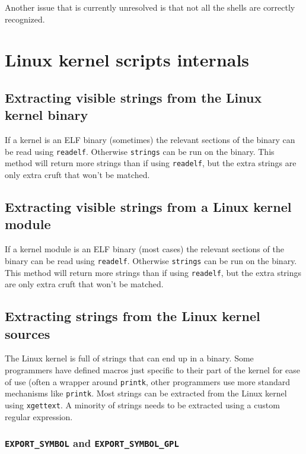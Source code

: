 \documentclass[10pt]{article}
\begin{document}
Another issue that is currently unresolved is that not all the shells are correctly recognized.

\section{Linux kernel scripts internals}

\subsection{Extracting visible strings from the Linux kernel binary}

If a kernel is an ELF binary (sometimes) the relevant sections of the
binary can be read using \texttt{readelf}. Otherwise \texttt{strings} can be
run on the binary. This method will return more strings than if using
\texttt{readelf}, but the extra strings are only extra cruft that won't be
matched.

\subsection{Extracting visible strings from a Linux kernel module}

If a kernel module is an ELF binary (most cases) the relevant sections of the
binary can be read using \texttt{readelf}. Otherwise \texttt{strings} can be
run on the binary. This method will return more strings than if using
\texttt{readelf}, but the extra strings are only extra cruft that won't be
matched.

\subsection{Extracting strings from the Linux kernel sources}

The Linux kernel is full of strings that can end up in a binary. Some
programmers have defined macros just specific to their part of the kernel for
ease of use (often a wrapper around \texttt{printk}, other programmers use
more standard mechanisms like \texttt{printk}. Most strings can be extracted
from the Linux kernel using \texttt{xgettext}. A minority of strings needs to
be extracted using a custom regular expression.

\subsubsection{\texttt{EXPORT\_SYMBOL} and \texttt{EXPORT\_SYMBOL\_GPL}}
\end{document}

